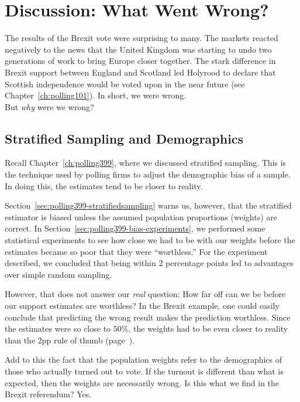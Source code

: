 \section{Discussion: What Went Wrong?}
The results of the Brexit vote were surprising to many. The markets reacted negatively to the news that the United Kingdom was starting to undo two generations of work to bring Europe closer together. The stark difference in Brexit support between England and Scotland led Holyrood to declare that Scottish independence would be voted upon in the near future (see Chapter~\ref{ch:polling101}).\cite{erlanger-2016} In short, we were wrong. \\

But \emph{why} were we wrong?








\subsection{Stratified Sampling and Demographics}
Recall Chapter~\ref{ch:polling399}, where we discussed stratified sampling. This is the technique used by polling firms to adjust the demographic bias of a sample. In doing this, the estimates tend to be closer to reality.

Section~\ref{sec:polling399-stratifiedsampling} warns us, however, that the stratified estimator is biased unless the assumed population proportions (weights) are correct. In Section~\ref{sec:polling399-bias-experiments}, we performed some statistical experiments to see how close we had to be with our weights before the estimates became so poor that they were ``worthless.'' For the experiment described, we concluded that being within $2$ percentage points led to advantages over simple random sampling.

However, that does not answer our \emph{real} question: How far off can we be before our support estimates are worthless? In the Brexit example, one could easily conclude that predicting the wrong result makes the prediction worthless. Since the estimates were so close to $50\%$, the weights had to be even closer to reality than the 2pp rule of thumb (page~\pageref{box:polling399-2pp}).

Add to this the fact that the population weights refer to the demographics of those who actually turned out to vote. If the turnout is different than what is expected, then the weights are necessarily wrong. Is this what we find in the Brexit referendum? Yes.

